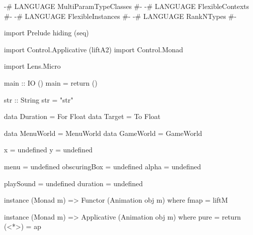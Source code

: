 \begin{code}
{-# LANGUAGE MultiParamTypeClasses #-}
{-# LANGUAGE FlexibleContexts #-}
{-# LANGUAGE FlexibleInstances #-}
{-# LANGUAGE RankNTypes #-}

import Prelude hiding (seq)

import Control.Applicative (liftA2)
import Control.Monad

import Lens.Micro

main :: IO ()
main = return ()

str :: String
str = "str"

data Duration = For Float
data Target = To Float

data MenuWorld = MenuWorld
data GameWorld = GameWorld

x = undefined
y = undefined

menu = undefined
obscuringBox = undefined
alpha = undefined

playSound = undefined
duration = undefined

instance (Monad m) => Functor (Animation obj m) where
  fmap = liftM

instance (Monad m) => Applicative (Animation obj m) where
  pure = return
  (<*>) = ap
\end{code}
